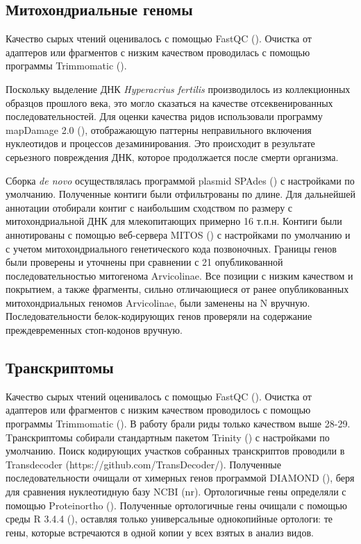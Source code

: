 \subsection{Митохондриальные геномы}

Качество сырых чтений оценивалось с помощью FastQC (\cite{Andrews2010}). Очистка от адаптеров или фрагментов с низким качеством проводилась с помощью программы Trimmomatic (\cite{Bolger2014}). 

Поскольку выделение ДНК \textit{Hyperacrius fertilis} производилось из коллекционных образцов прошлого века, это могло сказаться на качестве отсеквенированных последовательностей. Для оценки качества ридов использовали программу mapDamage 2.0 (\cite{Jonsson2013}), отображающую паттерны неправильного включения нуклеотидов и процессов дезаминирования. Это происходит в результате серьезного повреждения ДНК, которое продолжается после смерти организма.

Сборка \textit{de novo} осуществлялась программой plasmid SPAdes (\cite{Bankevich2012}) с настройками по умолчанию. Полученные контиги были отфильтрованы по длине. Для дальнейшей аннотации отобирали контиг с наибольшим сходством по размеру с митохондриальной ДНК для млекопитающих примерно 16 т.п.н. Контиги были аннотированы с помощью веб-сервера MITOS (\cite{Bernt2013}) с настройками по умолчанию и с учетом митохондриального генетического кода позвоночных. Границы генов были проверены и уточнены при сравнении с 21 опубликованной последовательностью митогенома Arvicolinae. Все позиции с низким качеством и покрытием, а также фрагменты, сильно отличающиеся от ранее опубликованных митохондриальных геномов Arvicolinae, были заменены на N вручную. Последовательности белок-кодирующих генов проверяли на содержание преждевременных стоп-кодонов вручную.


\subsection{Транскриптомы}

Качество сырых чтений оценивалось с помощью FastQC (\cite{Andrews2010}). Очистка от адаптеров или фрагментов с низким качеством проводилось с помощью программы Trimmomatic (\cite{Bolger2014}). В работу брали риды только качеством выше 28-29. Tранскриптомы собирали стандартным пакетом Trinity (\cite{Grabherr2011}) с настройками по умолчанию. Поиск кодирующих участков собранных транскриптов проводили в Transdecoder (https://github.com/TransDecoder/). Полученные последовательности очищали от химерных генов программой DIAMOND (\cite{Buchfink2015}), беря для сравнения нуклеотидную базу NCBI (nr). Ортологичные гены определяли с помощью Proteinortho (\cite{Lechner2011}). Полученные ортологичные гены очищали с помощью среды R 3.4.4 (\cite{RCoreTeam2017}), оставляя только универсальные однокопийные ортологи: те гены, которые встречаются в одной копии у всех взятых в анализ видов. 


